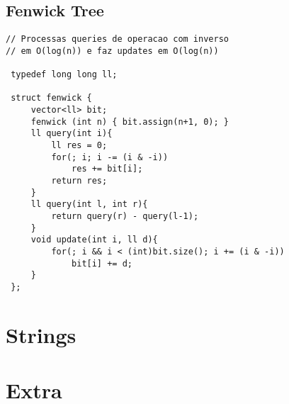 \documentclass[11pt, a4paper, twoside]{article}
\begin{document}
\subsection{Fenwick Tree}
\begin{lstlisting}
// Processas queries de operacao com inverso
// em O(log(n)) e faz updates em O(log(n))

 typedef long long ll;
 
 struct fenwick {
     vector<ll> bit;
     fenwick (int n) { bit.assign(n+1, 0); }
     ll query(int i){
         ll res = 0;
         for(; i; i -= (i & -i))
             res += bit[i];
         return res;
     }
     ll query(int l, int r){
         return query(r) - query(l-1);
     }
     void update(int i, ll d){
         for(; i && i < (int)bit.size(); i += (i & -i))
             bit[i] += d;
     }
 };
\end{lstlisting}



%
%

\section{Strings}

\pagebreak


%
%

\section{Extra}
\end{document}
